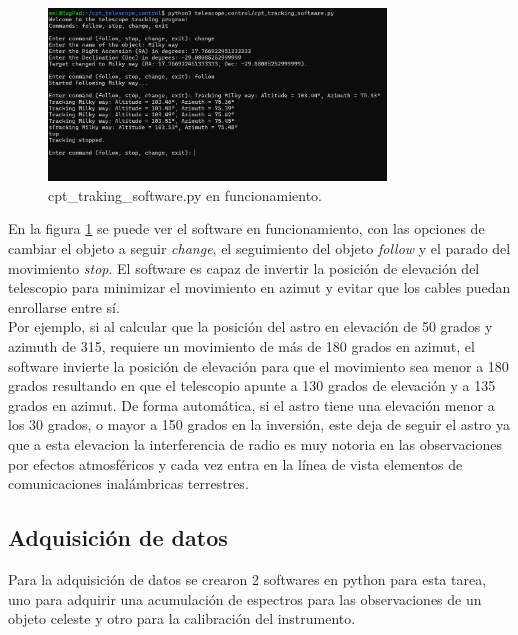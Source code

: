 \begin{figure}
    \centering
    \includegraphics[width=0.8\textwidth]{img/traking}
    \caption{cpt\_traking\_software.py en funcionamiento.}
    \label{fig:control}
\end{figure}

En la figura \ref{fig:control} se puede ver el software en funcionamiento, con las opciones de cambiar el objeto a seguir \textit{change}, el seguimiento del objeto \textit{follow} y el parado del movimiento \textit{stop}. El software es capaz de invertir la posición de elevación del telescopio para minimizar el movimiento en azimut y evitar que los cables puedan enrollarse entre sí.\\

Por ejemplo, si al calcular que la posición del astro en elevación de 50 grados y azimuth de 315, requiere un movimiento de más de 180 grados en azimut, el software invierte la posición de elevación para que el movimiento sea menor a 180 grados resultando en que el telescopio apunte a 130 grados de elevación y a 135 grados en azimut. De forma automática, si el astro tiene una elevación menor a los 30 grados, o mayor a 150 grados en la inversión, este deja de seguir el astro ya que a esta elevacion la interferencia de radio es muy notoria en las observaciones por efectos atmosféricos y cada vez entra en la línea de vista elementos de comunicaciones inalámbricas terrestres.\\

\subsection{Adquisición de datos} 

Para la adquisición de datos se crearon 2 softwares en python para esta tarea, uno para adquirir una acumulación de espectros para las observaciones de un objeto celeste y otro para la calibración del instrumento.\\

